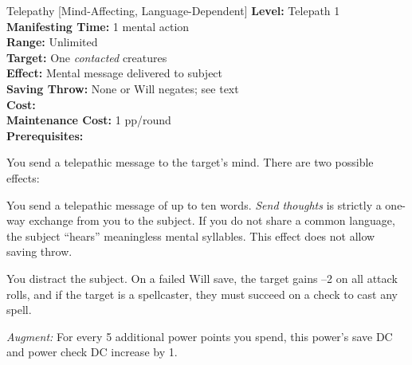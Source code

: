 {Telepathy [Mind-Affecting, Language-Dependent]}
{
	\textbf{Level:}
	Telepath 1\\
	\textbf{Manifesting Time:}
	1 mental action\\
	\textbf{Range:}
	Unlimited\\
	\textbf{Target:}
	One \emph{contacted} creatures\\
	\textbf{Effect:}
	Mental message delivered to subject\\
	\textbf{Saving Throw:}
	None or Will negates; see text\\
	\textbf{Cost:}
	\\
	\textbf{Maintenance Cost:}
	1 pp/round\\
	\textbf{Prerequisites:}
	\\
}
{
	You send a telepathic message to the target's mind. There are two possible effects:
	\begin{itemize*}
		\item You send a telepathic message of up to ten words. \emph{Send thoughts} is strictly a one-way exchange from you to the subject. If you do not share a common language, the subject ``hears'' meaningless mental syllables. This effect does not allow saving throw.
		\item You distract the subject. On a failed Will save, the target gains --2 on all attack rolls, and if the target is a spellcaster, they must succeed on a  check to cast any spell.
	\end{itemize*}

	\textit{Augment:} For every 5 additional power points you spend, this power's save DC and power check DC increase by 1.
}
